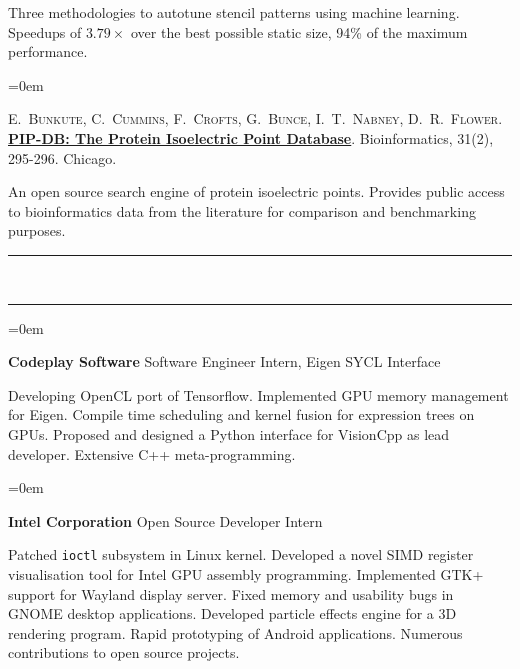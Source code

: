 \documentclass[a4paper,11pt,hidelinks]{scrartcl}
\newcommand{\MarginText}[1]{\marginpar{\raggedleft\itshape\normalsize#1}}
\newcommand{\Title}[1]{\noindent\rule{15cm}{0.4pt}\vspace{-.45em}\\
\noindent\spacedlowsmallcaps{\color{titlecolour}{#1}}

\vspace{-.85em}\noindent\rule{15cm}{0.4pt}\vspace{.2em}}
\newcommand{\Description}[1]{\hangindent=0em\hangafter=0%
\noindent\normalsize{#1}\vspace{1em}}
\newcommand{\ShortJob}[3]{\Description{\MarginText{#1}\textbf{#2},
  \textit{#3}}}
\newcommand{\Job}[4]{\Description{\MarginText{#1}\textbf{#2},
  \textit{#3}\newline\vspace{-.8em}

  \noindent
  #4}}
\begin{document}
\begin{cv}
{  \noindent %
  Three methodologies to autotune stencil patterns using machine learning. Speedups of $3.79\times$ over the best possible static size, 94\% of the maximum performance.%
}

\Description{%
  \MarginText{2015}%
  E.\ \textsc{Bunkute}, %
  C.\ \textsc{Cummins}, %
  F.\ \textsc{Crofts}, %
  G.\ \textsc{Bunce}, %
  I.\ T.\ \textsc{Nabney}, %
  D.\ R.\ \textsc{Flower}.
  \textbf{\href{http://bioinformatics.oxfordjournals.org/content/31/2/295.full?etoc}{PIP-DB:
      The Protein Isoelectric Point Database}}.
  Bioinformatics, 31(2), 295-296. Chicago. %
  \newline\vspace{-.8em}

  \noindent %
  An open source search engine of protein isoelectric points. Provides public access to bioinformatics data from the literature for comparison and benchmarking purposes.%
}


\newpage

\Title{Professional Experience}

\Description{\MarginText{2016}\textbf{Codeplay Software}
  \newline Software Engineer Intern, Eigen SYCL Interface
  \newline\vspace{-.8em}

  \noindent %
  Developing OpenCL port of Tensorflow. Implemented GPU memory management for Eigen. Compile time scheduling and kernel fusion for expression trees on GPUs. Proposed and designed a Python interface for VisionCpp as lead developer. Extensive C++ meta-programming.%
}

\Description{\MarginText{2012--2013}\textbf{Intel Corporation}
  \newline Open Source Developer Intern
  \newline\vspace{-.8em}

  \noindent %
  Patched \texttt{ioctl} subsystem in Linux kernel. Developed a novel SIMD register visualisation tool for Intel GPU assembly programming. Implemented GTK+ support for Wayland display server. Fixed memory and usability bugs in GNOME desktop applications. Developed particle effects engine for a 3D rendering program. Rapid prototyping of Android applications. Numerous contributions to open source projects.%
}


\end{cv}
\end{document}
